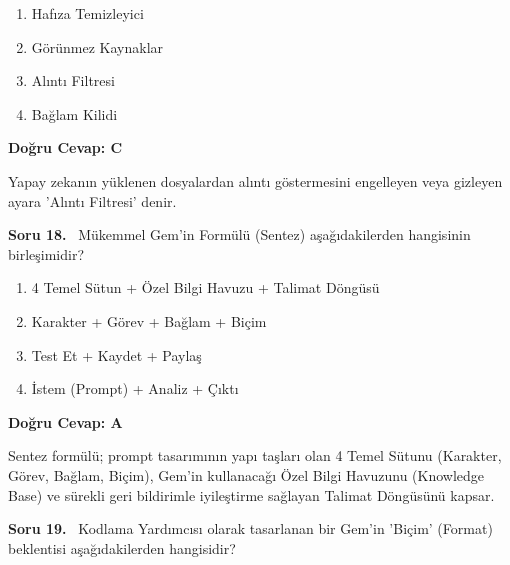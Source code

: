 \documentclass[11pt,a4paper,openany]{book}
\begin{document}
\begin{enumerate}[label=\Alph*), leftmargin=25pt, topsep=4pt, itemsep=2pt]
        \item Hafıza Temizleyici
        \item Görünmez Kaynaklar
        \item Alıntı Filtresi
        \item Bağlam Kilidi
\end{enumerate}

\vspace{4pt}
\begin{tcolorbox}[title=Cevap ve Açıklama, colback=gray!3!white, colframe=primarycolor!90!black, arc=2mm, fonttitle=\bfseries\sffamily, top=6pt, bottom=6pt]
    \textbf{Doğru Cevap: C}

    \vspace{2pt}
    Yapay zekanın yüklenen dosyalardan alıntı göstermesini engelleyen veya gizleyen ayara 'Alıntı Filtresi' denir.
\end{tcolorbox}
\vspace{10pt}
\needspace{5cm}
\vspace{8pt}
\noindent\textbf{\large\sffamily Soru 18.} \ Mükemmel Gem'in Formülü (Sentez) aşağıdakilerden hangisinin birleşimidir?

\begin{enumerate}[label=\Alph*), leftmargin=25pt, topsep=4pt, itemsep=2pt]
        \item 4 Temel Sütun + Özel Bilgi Havuzu + Talimat Döngüsü
        \item Karakter + Görev + Bağlam + Biçim
        \item Test Et + Kaydet + Paylaş
        \item İstem (Prompt) + Analiz + Çıktı
\end{enumerate}

\vspace{4pt}
\begin{tcolorbox}[title=Cevap ve Açıklama, colback=gray!3!white, colframe=primarycolor!90!black, arc=2mm, fonttitle=\bfseries\sffamily, top=6pt, bottom=6pt]
    \textbf{Doğru Cevap: A}

    \vspace{2pt}
    Sentez formülü; prompt tasarımının yapı taşları olan 4 Temel Sütunu (Karakter, Görev, Bağlam, Biçim), Gem'in kullanacağı Özel Bilgi Havuzunu (Knowledge Base) ve sürekli geri bildirimle iyileştirme sağlayan Talimat Döngüsünü kapsar.
\end{tcolorbox}
\vspace{10pt}
\needspace{5cm}
\vspace{8pt}
\noindent\textbf{\large\sffamily Soru 19.} \ Kodlama Yardımcısı olarak tasarlanan bir Gem'in 'Biçim' (Format) beklentisi aşağıdakilerden hangisidir?
\end{document}
